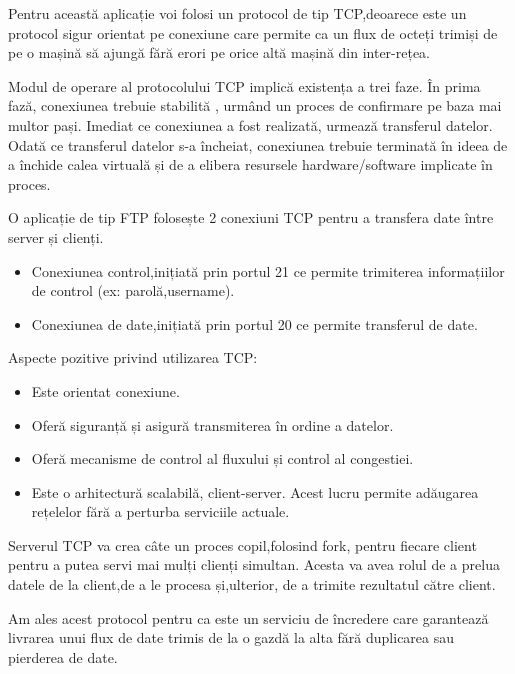 \documentclass[runningheads]{llncs}
\begin{document}
\par Pentru această aplicație voi folosi un protocol de tip TCP,deoarece este un protocol sigur orientat pe conexiune care permite ca un flux de octeți trimiși de pe o mașină să ajungă fără erori pe orice altă mașină din inter-rețea.
\par Modul de operare al protocolului TCP implică existența a trei faze. În prima fază, conexiunea trebuie stabilită , urmând un proces de confirmare pe baza mai multor pași. Imediat ce conexiunea a fost realizată, urmează transferul datelor. Odată ce transferul datelor s-a încheiat, conexiunea trebuie terminată în ideea de a închide calea virtuală și de a elibera resursele hardware/software implicate în proces.
\par O aplicație de tip FTP folosește 2 conexiuni TCP pentru a transfera date între server și clienți.
\begin{itemize}
  \item Conexiunea control,inițiată prin portul 21 ce permite trimiterea informațiilor de control (ex: parolă,username).
  \item Conexiunea de date,inițiată prin portul 20 ce permite transferul de date.
\end{itemize}
\par
\par Aspecte pozitive privind utilizarea TCP:
\begin{itemize}
  \item Este orientat conexiune.
  \item Oferă siguranță și asigură transmiterea în ordine a datelor.
  \item Oferă mecanisme de control al fluxului și control al congestiei.
  \item Este o arhitectură scalabilă, client-server. Acest lucru permite adăugarea rețelelor fără a perturba serviciile actuale.
 
\end{itemize}
\par Serverul TCP va crea câte un proces copil,folosind fork, pentru fiecare client pentru a putea servi mai mulți clienți simultan. Acesta va avea rolul de a prelua datele de la client,de a le procesa și,ulterior, de a trimite rezultatul către client.
\par Am ales acest protocol pentru ca este un serviciu de încredere care garantează livrarea unui flux de date trimis de la o gazdă la alta fără duplicarea sau pierderea de date.
\end{document}

